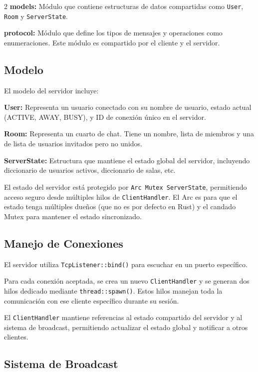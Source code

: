 \documentclass[letter,11pt]{article}
\begin{document}
\begin{multicols}{2}
\textbf{models:} Módulo que contiene estructuras de datos compartidas como \texttt{User}, \texttt{Room} y \texttt{ServerState}.

\textbf{protocol:} Módulo que define los tipos de mensajes y operaciones como enumeraciones.
Este módulo es compartido por el cliente y el servidor.

\subsection{Modelo}

El modelo del servidor incluye:

\textbf{User:} Representa un usuario conectado con su nombre de usuario, estado actual (ACTIVE, AWAY, BUSY), y ID de conexión único en el servidor.

\textbf{Room:} Representa un cuarto de chat. Tiene un nombre, lista de miembros y una de lista de usuarios invitados pero no unidos.

\textbf{ServerState:} Estructura que mantiene el estado global del servidor, incluyendo diccionario de usuarios activos, diccionario de salas, etc.

El estado del servidor está protegido por \texttt{Arc Mutex ServerState}, permitiendo acceso seguro desde múltiples hilos de \texttt{ClientHandler}. El Arc es para que el estado tenga múltiples dueños (que no es por defecto en Rust) y el candado Mutex para mantener el estado sincronizado.

\subsection{Manejo de Conexiones}

El servidor utiliza \texttt{TcpListener::bind()} para escuchar en un puerto específico. 

Para cada conexión aceptada, se crea un nuevo \texttt{ClientHandler} y se generan dos hilos dedicado mediante \texttt{thread::spawn()}. Estos hilos manejan toda la comunicación con ese cliente específico durante su sesión.

El \texttt{ClientHandler} mantiene referencias al estado compartido del servidor y al sistema de broadcast, permitiendo actualizar el estado global y notificar a otros clientes.

\subsection{Sistema de Broadcast}


\end{multicols}
\end{document}
